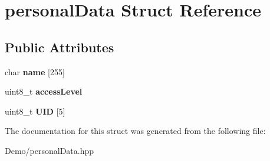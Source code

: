\hypertarget{structpersonal_data}{}\section{personal\+Data Struct Reference}
\label{structpersonal_data}
\subsection*{Public Attributes}
\begin{DoxyCompactItemize}
\item 
\mbox{\label{structpersonal_data_abc1c669dbba62756cd53beab43cfd72d}} 
char {\bfseries name} \mbox{[}255\mbox{]}
\item 
\mbox{\label{structpersonal_data_a4ef7bb106614061624561a0c403ec223}} 
uint8\+\_\+t {\bfseries access\+Level}
\item 
\mbox{\label{structpersonal_data_a4c7d4c2a45f4e8f3295b094b8bc1da41}} 
uint8\+\_\+t {\bfseries U\+ID} \mbox{[}5\mbox{]}
\end{DoxyCompactItemize}


The documentation for this struct was generated from the following file\+:\begin{DoxyCompactItemize}
\item 
Demo/personal\+Data.\+hpp\end{DoxyCompactItemize}
